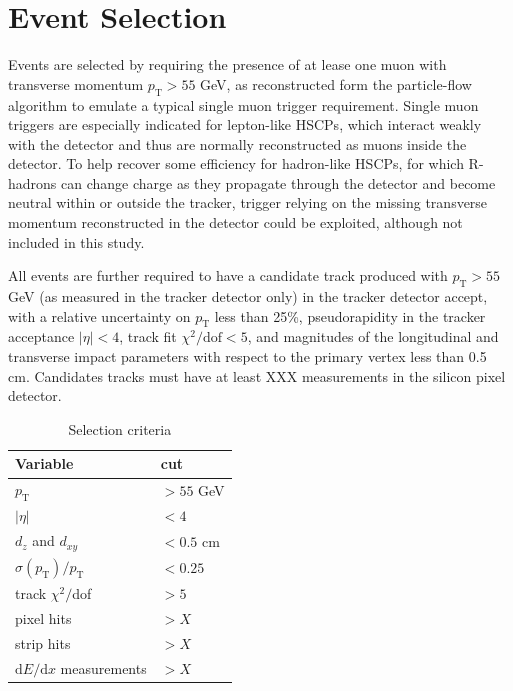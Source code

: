 \documentclass[11pt,twoside,a4paper]{article}
\begin{document}
\section{Event Selection}

Events are selected by requiring the presence of at lease one muon with transverse momentum $p_{\mathrm{T}} > 55$ GeV, as reconstructed form the particle-flow algorithm to emulate a typical single muon trigger requirement.
Single muon triggers are especially indicated for lepton-like HSCPs, which interact weakly with the detector and thus are normally reconstructed as muons inside the detector.
To help recover some efficiency for hadron-like HSCPs, for which R-hadrons can change charge as they propagate through the detector and become neutral within or outside the tracker, trigger relying on the missing transverse momentum reconstructed in the detector could be exploited, although not included in this study. 

All events are further required to have a candidate track produced with $p_{\mathrm{T}} > 55$ GeV (as measured in the tracker detector only) in the tracker detector accept, with a relative uncertainty on $p_{\mathrm{T}}$ less than 25\%, pseudorapidity in the tracker acceptance $|\eta| < 4$, track fit $\chi^2/\mathrm{dof} < 5$, and magnitudes of the longitudinal and transverse impact parameters with respect to the primary vertex less than 0.5 cm. 
Candidates tracks must have at least XXX measurements in the silicon pixel detector.

\begin{table}
 \centering
 \caption{Selection criteria\label{tab:selection}}
 \begin{tabular}{ll}
  \toprule
  Variable 			& cut \\ 
  \midrule	
  $p_{\mathrm{T}}$		& $> 55$ GeV \\
  $|\eta|$			& $< 4$ \\
  $d_z$ and $d_{xy}$		& $< 0.5$ cm \\
  $\sigma(p_{\mathrm{T}})/p_{\mathrm{T}}$		& $< 0.25$ \\
  track $\chi^2/$dof		& $> 5$ \\
  pixel hits			& $> X$ \\
  strip hits			& $> X$ \\
  $\mathrm{d}E/\mathrm{d}x$ measurements			& $> X$ \\
  \bottomrule
 \end{tabular}
\end{table}
\end{document}
